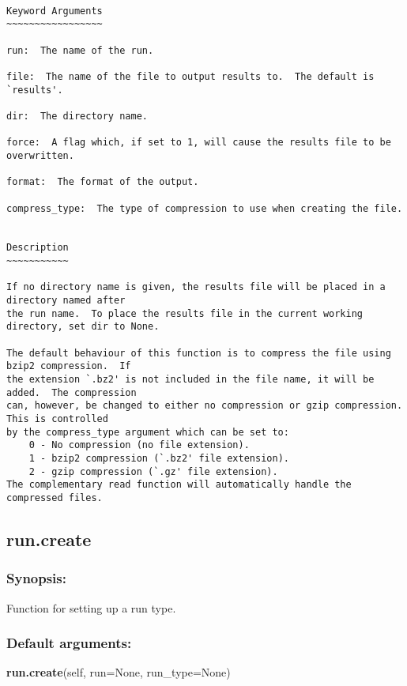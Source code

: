 {\scriptsize
\begin{verbatim}

Keyword Arguments
~~~~~~~~~~~~~~~~~

run:  The name of the run.

file:  The name of the file to output results to.  The default is `results'.

dir:  The directory name.

force:  A flag which, if set to 1, will cause the results file to be overwritten.

format:  The format of the output.

compress_type:  The type of compression to use when creating the file.


Description
~~~~~~~~~~~

If no directory name is given, the results file will be placed in a directory named after
the run name.  To place the results file in the current working directory, set dir to None.

The default behaviour of this function is to compress the file using bzip2 compression.  If
the extension `.bz2' is not included in the file name, it will be added.  The compression
can, however, be changed to either no compression or gzip compression.  This is controlled
by the compress_type argument which can be set to:
    0 - No compression (no file extension).
    1 - bzip2 compression (`.bz2' file extension).
    2 - gzip compression (`.gz' file extension).
The complementary read function will automatically handle the compressed files.
\end{verbatim}
}



\newpage

\subsection{run.create}


\subsubsection{Synopsis:}

Function for setting up a run type.

\subsubsection{Default arguments:}

\textsf{\textbf{run.create}(self, run=None, run\_type=None)
}


